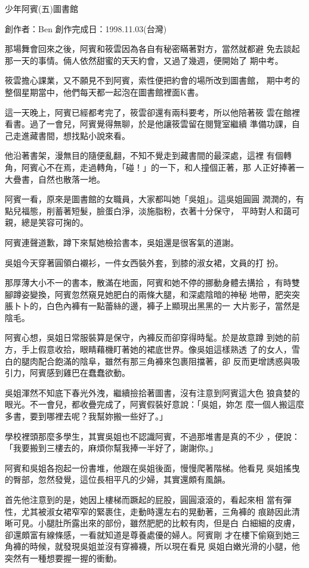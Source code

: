 



少年阿賓(五)圖書館

創作者：Ben
創作完成日：1998.11.03(台灣)


那場舞會回來之後，阿賓和筱雲因為各自有秘密瞞著對方，當然就都避
免去談起那一天的事情。倆人依然甜蜜的天天約會，又過了幾週，便開始了
期中考。

筱雲擔心課業，又不願見不到阿賓，索性便把約會的場所改到圖書館，
期中考的整個星期當中，他們每天都一起泡在圖書館裡面K書。

這一天晚上，阿賓已經都考完了，筱雲卻還有兩科要考，所以他陪著筱
雲在館裡看書。過了一會兒，阿賓覺得無聊，於是他讓筱雲留在閱覽室繼續
準備功課，自己走進藏書間，想找點小說來看。

他沿著書架，漫無目的隨便亂翻，不知不覺走到藏書間的最深處，這裡
有個轉角，阿賓心不在焉，走過轉角，「碰！」的一下，和人撞個正著，那
人正好捧著一大疊書，自然也散落一地。

阿賓一看，原來是圖書館的女職員，大家都叫她「吳姐」。這吳姐圓圓
潤潤的，有點兒福態，削蓄著短髮，臉蛋白淨，淡施脂粉，衣著十分保守，
平時對人和藹可親，總是笑容可掬的。

阿賓連聲道歉，蹲下來幫她檢拾書本，吳姐還是很客氣的道謝。

吳姐今天穿著圓領白襯衫，一件女西裝外套，到膝的淑女裙，文員的打
扮。

那厚薄大小不一的書本，散滿在地面，阿賓和她不停的挪動身體去搆拾
，有時雙腳蹲姿變換，阿賓忽然窺見她肥白的兩條大腿，和深處陰暗的神秘
地帶，肥突突脹卜卜的，白色內褲有一點蕾絲的邊，褲子上顯現出黑黑的一
大片影子，當然是陰毛。

阿賓心想，吳姐日常服裝算是保守，內褲反而卻穿得時髦。於是故意蹲
到她的前方，手上假意收拾，眼睛藉機盯著她的裙底世界。像吳姐這樣熟透
了的女人，雪白的腿肉配合飽滿的陰阜，雖然有那三角褲來包裹阻擋著，卻
反而更增誘惑與吸引力，阿賓感到雞巴在蠢蠢欲動。

吳姐渾然不知底下春光外洩，繼續撿拾著圖書，沒有注意到阿賓這大色
狼貪婪的眼光。不一會兒，都收疊完成了，阿賓假裝好意說：「吳姐，妳怎
麼一個人搬這麼多書，要到哪裡去呢？我幫妳搬一些好了。」

學校裡頭那麼多學生，其實吳姐也不認識阿賓，不過那堆書是真的不少
，便說：「我要搬到三樓去的，麻煩你幫我捧一半好了，謝謝你。」

阿賓和吳姐各抱起一份書堆，他跟在吳姐後面，慢慢爬著階梯。他看見
吳姐搖曳的臀部，忽然發覺，這位長相平凡的少婦，其實還頗有風韻。

首先他注意到的是，她因上樓梯而蹶起的屁股，圓圓滾滾的，看起來相
當有彈性，尤其被淑女裙窄窄的緊裹住，走動時還左右的晃動著，三角褲的
痕跡因此清晰可見。小腿肚所露出來的部份，雖然肥肥的比較有肉，但是白
白細細的皮膚，卻還頗富有線條感，一看就知道是尊養處優的婦人。阿賓剛
才在樓下偷窺到她三角褲的時候，就發現吳姐並沒有穿褲襪，所以現在看見
吳姐白嫩光滑的小腿，他突然有一種想要握一握的衝動。

